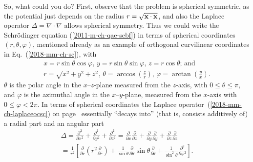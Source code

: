 So, what could you do?
First, observe that the problem is spherical symmetric,
as the potential   just depends on the radius $r=\sqrt{{\bf x}\cdot {\bf x}}$,
and also the Laplace operator $\Delta =
\nabla \cdot \nabla $ allows spherical symmetry.
Thus we could write   the Schr\"odinger equation (\ref{2011-m-ch-qae-sebf})
in terms of spherical coordinates
$(r, \theta ,\varphi )$,
mentioned already as an example of orthogonal curvilinear coordinates in Eq.~(\ref{2018-mm-ch-sc}),
with
\begin{equation}
\begin{split}
x  = r\sin \theta \cos \varphi \text{, }
y = r\sin \theta \sin \varphi \text{, }
z = r\cos \theta  \text{; and}\\
r=\sqrt{x^2+y^2+z^2}\text{, }
\theta = \arccos \left(\frac{z}{r}\right)\text{, }
\varphi=  \arctan \left(\frac{y}{x}\right).
\end{split}
\label{2018-mm-ch-sc1}
\end{equation}
$\theta$ is the polar angle in the $x$--$z$-plane measured
from the $z$-axis, with $0 \le \theta \le \pi$,
and $\varphi $ is  the azimuthal angle in the $x$--$y$-plane, measured
from the $x$-axis with $0 \le \varphi < 2 \pi$.
In terms of spherical coordinates the Laplace operator~(\ref{2018-mm-ch-laplaceocsc})
on page~\pageref{2018-mm-ch-laplaceocsc}
essentially ``decays into'' (that is, consists additively of)
a radial part and an angular part
\begin{equation}
\begin{split}
\Delta =
 \frac{\partial^2}{\partial x^2}
+
\frac{\partial^2}{\partial y^2}
+
\frac{\partial^2}{\partial z^2}
=
 \frac{\partial}{\partial x}
 \frac{\partial}{\partial x}
+
\frac{\partial}{\partial y}
 \frac{\partial}{\partial y}
+
\frac{\partial}{\partial z}
 \frac{\partial}{\partial z}
\\
=
\frac{1}{r^2} \left[ \frac{\partial}{\partial r}\left( r^2\frac{\partial}{\partial r}\right)
+
\frac{1}{\sin \theta}   \frac{\partial}{\partial \theta }
\sin \theta \frac{\partial}{\partial \theta }
+
\frac{1}{\sin^2 \theta} \frac{\partial^2}{\partial \varphi^2 }
\right].
\end{split}
\label{2011-m-ch-qae-losc}
\end{equation}


